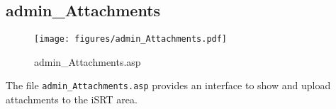 \subsection{admin\_Attachments}
\begin{figure}[htb]
    \begin{center}
        \texttt{[image: figures/admin\_Attachments.pdf]}
    \end{center}
    \caption{admin\_Attachments.asp}
    \label{fig:admin_Attachments}
\end{figure}

The file \verb|admin_Attachments.asp| provides an interface to show and upload
attachments to the iSRT area.
